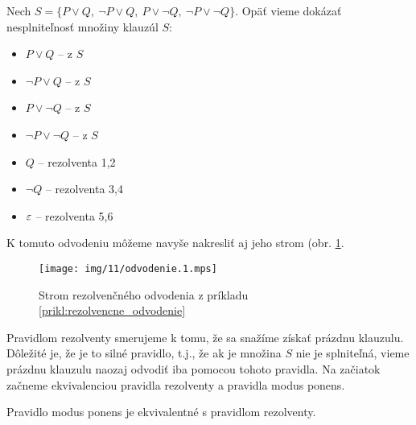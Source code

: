 \begin{priklad}
    \label{prikl:rezolvencne_odvodenie}
    Nech $S=\{P \lor Q,\ \neg P \lor Q,\ 
            P \lor \neg Q,\ \neg P \lor \neg Q\}$.
    Opäť vieme dokázať nesplniteľnosť množiny klauzúl $S$:

    \begin{itemize}
	\item[1:] $P \lor Q$ -- z $S$
	\item[2:] $\neg P \lor Q$ -- z $S$
	\item[3:] $P \lor \neg Q$ -- z $S$
	\item[4:] $\neg P \lor \neg Q$ -- z $S$
	\item[5:] $Q$ -- rezolventa 1,2
	\item[6:] $\neg Q$ -- rezolventa 3,4
        \item[7:] $\varepsilon$ -- rezolventa 5,6
    \end{itemize}

    K tomuto odvodeniu môžeme navyše nakresliť aj jeho strom (obr.
    \ref{fig:strom_odvodenia}.

    \begin{figure}[h]
	\centering\texttt{[image: img/11/odvodenie.1.mps]}
	\caption{Strom rezolvenčného odvodenia z príkladu 
            \ref{prikl:rezolvencne_odvodenie}}
        \label{fig:strom_odvodenia}
    \end{figure}
\end{priklad}

\begin{poznamka}
    Pravidlom rezolventy smerujeme k tomu, že sa snažíme získať
    prázdnu klauzulu. Dôležité je, že je to silné pravidlo,
    t.j., že ak je množina $S$ nie je splniteľná, vieme prázdnu
    klauzulu naozaj odvodiť iba pomocou tohoto pravidla. Na začiatok
    začneme ekvivalenciou pravidla rezolventy a pravidla modus ponens.
\end{poznamka}

\begin{lema}
    Pravidlo modus ponens je ekvivalentné s pravidlom rezolventy.
\end{lema}

